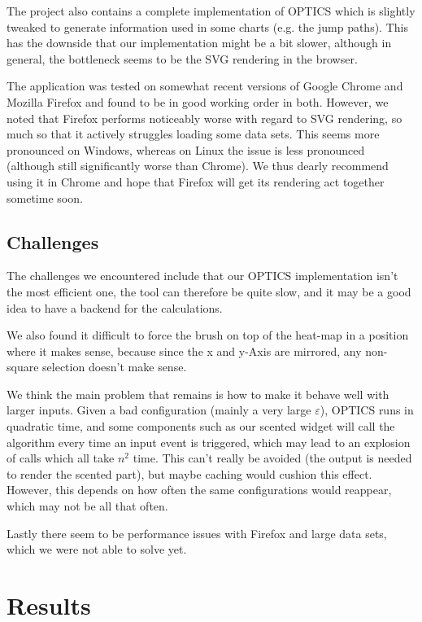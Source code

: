 \documentclass{vgtc} %
\begin{document}
The project also contains a complete implementation of OPTICS which is slightly tweaked to
generate information used in some charts (e.g. the jump paths). This has the downside
that our implementation might be a bit slower, although in general, the bottleneck seems
to be the SVG rendering in the browser.

The application was tested on somewhat recent versions of Google Chrome and Mozilla Firefox
and found to be in good working order in both. However, we noted that Firefox performs noticeably
worse with regard to SVG rendering, so much so that it actively struggles loading
some data sets. This seems more pronounced on Windows, whereas on Linux the issue is less pronounced
(although still significantly worse than Chrome). We thus dearly recommend using it in
Chrome and hope that Firefox will get its rendering act together sometime soon.

\subsection{Challenges}

The challenges we encountered include that our OPTICS implementation isn't the most efficient one, the tool can therefore be quite slow, and it may be a good idea to have a backend for the calculations.

We also found it difficult to force the brush on top of the heat-map in a position where it makes sense, because since the x and y-Axis are mirrored, any non-square selection doesn't make sense.

We think the main problem that remains is how to make it behave well with larger inputs. Given a bad configuration (mainly a very large $\varepsilon$), OPTICS runs in quadratic time, and some components such as our scented widget will call the algorithm every time an input event is triggered, which may lead to an explosion of calls which all take $ n^{2} $ time. This can't really be avoided (the output is needed to render the scented part), but maybe caching would cushion this effect. However, this depends on how often the same configurations would reappear, which may not be all that often.

Lastly there seem to be performance issues with Firefox and large data sets, which we were not able to solve yet.

\section{Results}
\end{document}

